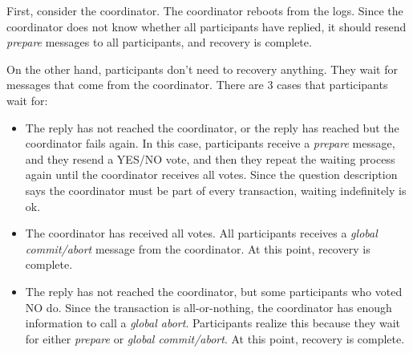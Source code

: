 First, consider the coordinator.
The coordinator reboots from the logs.
Since the coordinator does not know whether all participants have replied, it should resend \emph{prepare} messages to all participants, and recovery is complete.

On the other hand, participants don't need to recovery anything.
They wait for messages that come from the coordinator.
There are 3 cases that participants wait for:
\begin{itemize}
\item
The reply has not reached the coordinator, or the reply has reached but the coordinator fails again.
In this case, participants receive a \emph{prepare} message, and they resend a YES/NO vote, and then they repeat the waiting process again until the coordinator receives all votes.
Since the question description says the coordinator must be part of every transaction, waiting indefinitely is ok.
\item
The coordinator has received all votes.
All participants receives a \emph{global commit/abort} message from the coordinator.
At this point, recovery is complete.
\item
The reply has not reached the coordinator, but some participants who voted NO do.
Since the transaction is all-or-nothing, the coordinator has enough information to call a \emph{global abort}.
Participants realize this because they wait for either \emph{prepare} or \emph{global commit/abort}.
At this point, recovery is complete.
\end{itemize}

